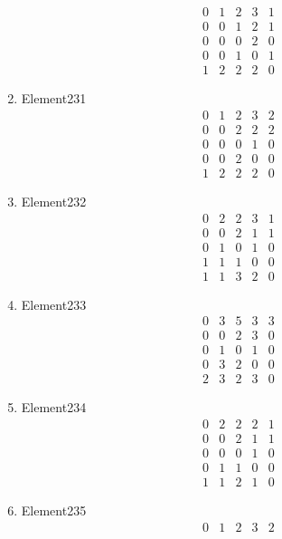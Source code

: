\documentclass[12pt]{article}
\begin{document}
\begin{multicols}{3}
\begin{enumerate}
\begin{equation*}
\begin{array}{ccccc}
0&1&2&3&1\\
0&0&1&2&1\\
0&0&0&2&0\\
0&0&1&0&1\\
1&2&2&2&0
\end{array}
\end{equation*}
\item Element231
\begin{equation*}
\begin{array}{ccccc}
0&1&2&3&2\\
0&0&2&2&2\\
0&0&0&1&0\\
0&0&2&0&0\\
1&2&2&2&0
\end{array}
\end{equation*}
\item Element232
\begin{equation*}
\begin{array}{ccccc}
0&2&2&3&1\\
0&0&2&1&1\\
0&1&0&1&0\\
1&1&1&0&0\\
1&1&3&2&0
\end{array}
\end{equation*}
\item Element233
\begin{equation*}
\begin{array}{ccccc}
0&3&5&3&3\\
0&0&2&3&0\\
0&1&0&1&0\\
0&3&2&0&0\\
2&3&2&3&0
\end{array}
\end{equation*}
\item Element234
\begin{equation*}
\begin{array}{ccccc}
0&2&2&2&1\\
0&0&2&1&1\\
0&0&0&1&0\\
0&1&1&0&0\\
1&1&2&1&0
\end{array}
\end{equation*}
\item Element235
\begin{equation*}
\begin{array}{ccccc}
0&1&2&3&2\\

\end{array}
\end{equation*}
\end{enumerate}
\end{multicols}
\end{document}
